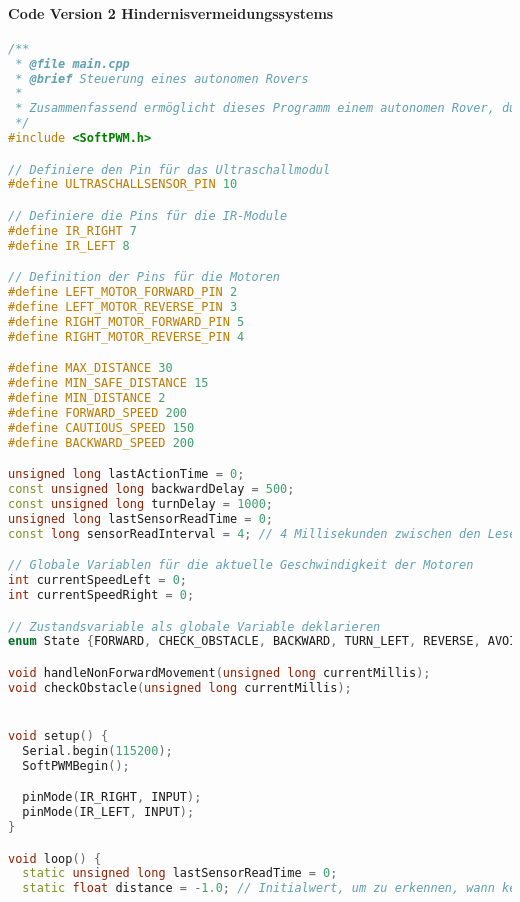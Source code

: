 \documentclass{vorlage-design-main}
\begin{document}
\newpage

\hypertarget{code-version-2-hindernisvermeidungssystems}{%
\paragraph{Code Version 2
Hindernisvermeidungssystems}\label{code-version-2-hindernisvermeidungssystems}}

\begin{lstlisting}[language={C++}]
/**
 * @file main.cpp
 * @brief Steuerung eines autonomen Rovers
 * 
 * Zusammenfassend ermöglicht dieses Programm einem autonomen Rover, durch eine Umgebung zu navigieren, indem es kontinuierlich Sensordaten liest, auf diese Daten reagiert und seine Bewegungen entsprechend anpasst, um Hindernissen auszuweichen und bestimmte Ziele zu erreichen.
 */
#include <SoftPWM.h>

// Definiere den Pin für das Ultraschallmodul
#define ULTRASCHALLSENSOR_PIN 10

// Definiere die Pins für die IR-Module
#define IR_RIGHT 7
#define IR_LEFT 8

// Definition der Pins für die Motoren
#define LEFT_MOTOR_FORWARD_PIN 2
#define LEFT_MOTOR_REVERSE_PIN 3
#define RIGHT_MOTOR_FORWARD_PIN 5
#define RIGHT_MOTOR_REVERSE_PIN 4

#define MAX_DISTANCE 30
#define MIN_SAFE_DISTANCE 15
#define MIN_DISTANCE 2
#define FORWARD_SPEED 200
#define CAUTIOUS_SPEED 150
#define BACKWARD_SPEED 200

unsigned long lastActionTime = 0;
const unsigned long backwardDelay = 500;
const unsigned long turnDelay = 1000;
unsigned long lastSensorReadTime = 0;
const long sensorReadInterval = 4; // 4 Millisekunden zwischen den Lesevorgängen

// Globale Variablen für die aktuelle Geschwindigkeit der Motoren
int currentSpeedLeft = 0;
int currentSpeedRight = 0;

// Zustandsvariable als globale Variable deklarieren
enum State {FORWARD, CHECK_OBSTACLE, BACKWARD, TURN_LEFT, REVERSE, AVOID, WAIT, ERROR} state = FORWARD;

void handleNonForwardMovement(unsigned long currentMillis);
void checkObstacle(unsigned long currentMillis);


void setup() {
  Serial.begin(115200);
  SoftPWMBegin();

  pinMode(IR_RIGHT, INPUT);
  pinMode(IR_LEFT, INPUT);
}

void loop() {
  static unsigned long lastSensorReadTime = 0;
  static float distance = -1.0; // Initialwert, um zu erkennen, wann keine Messung vorliegt


\end{lstlisting}
\end{document}
